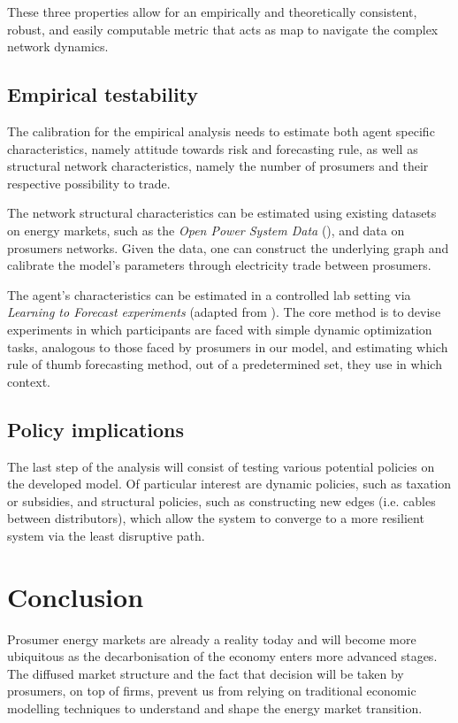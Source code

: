 \documentclass[american]{scrartcl}
\begin{document}
These three properties allow for an empirically and theoretically consistent, robust, and easily computable metric that acts as map to navigate the complex network dynamics.

\subsection{Empirical testability}

The calibration for the empirical analysis needs to estimate both agent specific characteristics, namely attitude towards risk and forecasting rule, as well as structural network characteristics, namely the number of prosumers and their respective possibility to trade.

The network structural characteristics can be estimated using existing datasets on energy markets, such as the \textit{Open Power System Data} (\cite{Wiese2019}), and data on prosumers networks. Given the data, one can construct the underlying graph and calibrate the model's parameters through electricity trade between prosumers.

The agent's characteristics can be estimated in a controlled lab setting via \textit{Learning to Forecast experiments} (adapted from \cite{Hommes2013}). The core method is to devise experiments in which participants are faced with simple dynamic optimization tasks, analogous to those faced by prosumers in our model, and estimating which rule of thumb forecasting method, out of a predetermined set, they use in which context.

\subsection{Policy implications}

The last step of the analysis will consist of testing various potential policies on the developed model. Of particular interest are dynamic policies, such as taxation or subsidies, and structural policies, such as constructing new edges (i.e. cables between distributors), which allow the system to converge to a more resilient system via the least disruptive path.

\section{Conclusion}

Prosumer energy markets are already a reality today and will become more ubiquitous as the decarbonisation of the economy enters more advanced stages. The diffused market structure and the fact that decision will be taken by prosumers, on top of firms, prevent us from relying on traditional economic modelling techniques to understand and shape the energy market transition.
\end{document}
